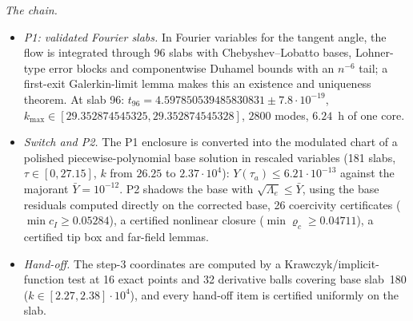 \documentclass[11pt]{amsart}
\theoremstyle{definition}
\theoremstyle{remark}
\newcommand{\Lam}{\Lambda}
\begin{document}
\emph{The chain.}
\begin{itemize}[leftmargin=*,itemsep=1pt]
\item \emph{P1: validated Fourier slabs.} In Fourier variables for the tangent angle, the flow is integrated through 96 slabs with Chebyshev--Lobatto bases, Lohner-type error blocks and componentwise Duhamel bounds with an $n^{-6}$ tail; a first-exit Galerkin-limit lemma makes this an existence and uniqueness theorem. At slab 96: $t_{96}=4.597850539485830831\pm7.8\cdot10^{-19}$, $k_{\max}\in[29.352874545325,29.352874545328]$, $2800$ modes, $6.24$~h of one core.
\item \emph{Switch and P2.} The P1 enclosure is converted into the modulated chart of a polished piecewise-polynomial base solution in rescaled variables (181 slabs, $\tau\in[0,27.15]$, $k$ from $26.25$ to $2.37\cdot10^4$): $Y(\tau_a)\le6.21\cdot10^{-13}$ against the majorant $\bar Y=10^{-12}$. P2 shadows the base with $\sqrt{\Lam_e}\le\bar Y$, using the base residuals computed directly on the corrected base, 26 coercivity certificates ($\min c_I\ge0.05284$), a certified nonlinear closure ($\min\varrho_c\ge0.04711$), a certified tip box and far-field lemmas.
\item \emph{Hand-off.} The step-3 coordinates are computed by a Krawczyk/implicit-function test at 16 exact points and 32 derivative balls covering base slab~180 ($k\in[2.27,2.38]\cdot10^4$), and every hand-off item is certified uniformly on the slab.
\end{itemize}
\end{document}
